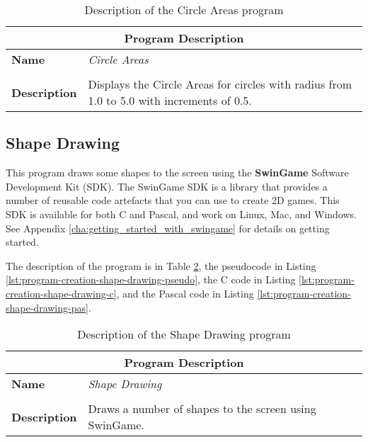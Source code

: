 \begin{table}[h]
\centering
\begin{tabular}{l|p{10cm}}
  \hline
  \multicolumn{2}{c}{\textbf{Program Description}} \\
  \hline
  \textbf{Name} & \emph{Circle Areas} \\
  \\
  \textbf{Description} & Displays the Circle Areas for circles with radius from 1.0 to 5.0 with increments of 0.5. \\
  \hline
\end{tabular}
\caption{Description of the Circle Areas program}
\label{tbl:program-creation-circle-area}
\end{table}


\clearpage


\clearpage
\subsection{Shape Drawing} %
\label{sub:shape_drawing}

This program draws some shapes to the screen using the \textbf{SwinGame} Software Development Kit (SDK). The SwinGame SDK is a library that provides a number of reusable code artefacts that you can use to create 2D games. This SDK is available for both C and Pascal, and work on Linux, Mac, and Windows. See Appendix \ref{cha:getting_started_with_swingame} for details on getting started.

The description of the program is in Table \ref{tbl:program-creation-shape-drawing}, the pseudocode in Listing \ref{lst:program-creation-shape-drawing-pseudo}, the C code in Listing \ref{lst:program-creation-shape-drawing-c}, and the Pascal code in Listing \ref{lst:program-creation-shape-drawing-pas}.

\begin{table}[h]
\centering
\begin{tabular}{l|p{10cm}}
  \hline
  \multicolumn{2}{c}{\textbf{Program Description}} \\
  \hline
  \textbf{Name} & \emph{Shape Drawing} \\
  \\
  \textbf{Description} & Draws a number of shapes to the screen using SwinGame. \\
  \hline
\end{tabular}
\caption{Description of the Shape Drawing program}
\label{tbl:program-creation-shape-drawing}
\end{table}

